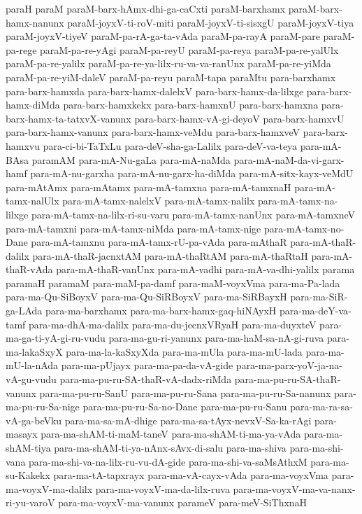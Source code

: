 {paraH
paraM
paraM-barx-hAmx-dhi-ga-caCxti
paraM-barxhamx
paraM-barx-hamx-nanunx
paraM-joyxV-ti-roV-miti
paraM-joyxV-ti-sisxgU
paraM-joyxV-tiya
paraM-joyxV-tiyeV
paraM-pa-rA-ga-ta-vAda
paraM-pa-rayA
paraM-pare
paraM-pa-rege
paraM-pa-re-yAgi
paraM-pa-reyU
paraM-pa-reya
paraM-pa-re-yalUlx
paraM-pa-re-yalilx
paraM-pa-re-ya-lilx-ru-va-va-ranUnx
paraM-pa-re-yiMda
paraM-pa-re-yiM-daleV
paraM-pa-reyu
paraM-tapa
paraMtu
para-barxhamx
para-barx-hamxda
para-barx-hamx-dalelxV
para-barx-hamx-da-lilxge
para-barx-hamx-diMda
para-barx-hamxkekx
para-barx-hamxnU
para-barx-hamxna
para-barx-hamx-ta-tatxvX-vanunx
para-barx-hamx-vA-gi-deyoV
para-barx-hamxvU
para-barx-hamx-vanunx
para-barx-hamx-veMdu
para-barx-hamxveV
para-barx-hamxvu
para-ci-bi-TaTxLu
para-deV-sha-ga-Lalilx
para-deV-va-teya
para-mA-BAsa
paramAM
para-mA-Nu-gaLa
para-mA-naMda
para-mA-naM-da-vi-garx-hamf
para-mA-nu-garxha
para-mA-nu-garx-ha-diMda
para-mA-sitx-kayx-veMdU
para-mAtAmx
para-mAtamx
para-mA-tamxna
para-mA-tamxnaH
para-mA-tamx-nalUlx
para-mA-tamx-nalelxV
para-mA-tamx-nalilx
para-mA-tamx-na-lilxge
para-mA-tamx-na-lilx-ri-su-varu
para-mA-tamx-nanUnx
para-mA-tamxneV
para-mA-tamxni
para-mA-tamx-niMda
para-mA-tamx-nige
para-mA-tamx-no-Dane
para-mA-tamxnu
para-mA-tamx-rU-pa-vAda
para-mAthaR
para-mA-thaR-dalilx
para-mA-thaR-jacnxtAM
para-mA-thaRtAM
para-mA-thaRtaH
para-mA-thaR-vAda
para-mA-thaR-vanUnx
para-mA-vadhi
para-mA-va-dhi-yalilx
parama
paramaH
paramaM
para-maM-pa-damf
para-maM-voyxVma
para-ma-Pa-lada
para-ma-Qu-SiBoyxV
para-ma-Qu-SiRBoyxV
para-ma-SiRBayxH
para-ma-SiR-ga-LAda
para-ma-barxhamx
para-ma-barx-hamx-gaq-hiNAyxH
para-ma-deY-va-tamf
para-ma-dhA-ma-dalilx
para-ma-du-jecnxVRyaH
para-ma-duyxteV
para-ma-ga-ti-yA-gi-ru-vudu
para-ma-gu-ri-yanunx
para-ma-haM-sa-nA-gi-ruva
para-ma-lakaSxyX
para-ma-la-kaSxyXda
para-ma-mUla
para-ma-mU-lada
para-ma-mU-la-nAda
para-ma-pUjayx
para-ma-pa-da-vA-gide
para-ma-parx-yoV-ja-na-vA-gu-vudu
para-ma-pu-ru-SA-thaR-vA-dadx-riMda
para-ma-pu-ru-SA-thaR-vanunx
para-ma-pu-ru-SanU
para-ma-pu-ru-Sana
para-ma-pu-ru-Sa-nanunx
para-ma-pu-ru-Sa-nige
para-ma-pu-ru-Sa-no-Dane
para-ma-pu-ru-Sanu
para-ma-ra-sa-vA-ga-beVku
para-ma-sa-mA-dhige
para-ma-sa-tAyx-nevxV-Sa-ka-rAgi
para-masayx
para-ma-shAM-ti-maM-taneV
para-ma-shAM-ti-ma-ya-vAda
para-ma-shAM-tiya
para-ma-shAM-ti-ya-nAnx-sAvx-di-salu
para-ma-shiva
para-ma-shi-vana
para-ma-shi-va-na-lilx-ru-vu-dA-gide
para-ma-shi-va-saMsAthxM
para-ma-su-Kakekx
para-ma-tA-tapxrayx
para-ma-vA-cayx-vAda
para-ma-voyxVma
para-ma-voyxV-ma-dalilx
para-ma-voyxV-ma-da-lilx-ruva
para-ma-voyxV-ma-va-nanx-ri-yu-varoV
para-ma-voyxV-ma-vanunx
parameV
para-meV-SiThxnaH
}
